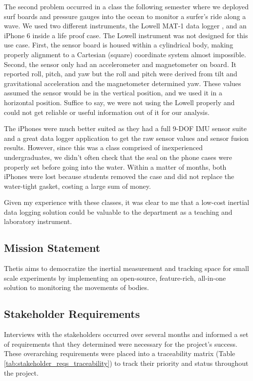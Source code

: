 The second problem occurred in a class the following semester where we deployed surf boards and pressure gauges into the ocean to monitor a surfer's ride along a wave.
We used two different instruments, the Lowell MAT-1 data logger \cite{lowell}, and an iPhone 6 inside a life proof case.
The Lowell instrument was not designed for this use case.
First, the sensor board is housed within a cylindrical body, making properly alignment to a Cartesian (square) coordinate system almost impossible.
Second, the sensor only had an accelerometer and magnetometer on board.
It reported roll, pitch, and yaw but the roll and pitch were derived from tilt and gravitational acceleration and the magnetometer determined yaw.
These values assumed the sensor would be in the vertical position, and we used it in a horizontal position.
Suffice to say, we were not using the Lowell properly and could not get reliable or useful information out of it for our analysis.

The iPhones were much better suited as they had a full 9-DOF IMU sensor suite and a great data logger application to get the raw sensor values and sensor fusion results.
However, since this was a class comprised of inexperienced undergraduates, we didn't often check that the seal on the phone cases were properly set before going into the water.
Within a matter of months, both iPhones were lost because students removed the case and did not replace the water-tight gasket, costing a large sum of money.

Given my experience with these classes, it was clear to me that a low-cost inertial data logging solution could be valuable to the department as a teaching and laboratory instrument.

\subsection{Mission Statement} 
Thetis aims to democratize the inertial measurement and tracking space for small scale experiments by implementing an open-source, feature-rich, all-in-one solution to monitoring the movements of bodies.

\subsection{Stakeholder Requirements} 
Interviews with the stakeholders occurred over several months and informed a set of requirements that they determined were necessary for the project's success.
These overarching requirements were placed into a traceability matrix (Table \ref{tab:stakeholder_reqs_traceability}) to track their priority and status throughout the project.

